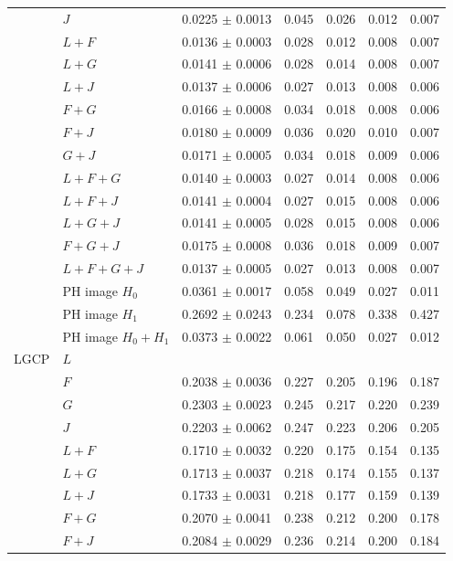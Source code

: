 \begin{longtable}{@{}ll c cccc@{}}
 & $J$ & 0.0225 $\pm$ 0.0013 & 0.045 & 0.026 & 0.012 & 0.007\\
 & $L{+}F$ & 0.0136 $\pm$ 0.0003 & 0.028 & 0.012 & 0.008 & 0.007\\
 & $L{+}G$ & 0.0141 $\pm$ 0.0006 & 0.028 & 0.014 & 0.008 & 0.007\\
 & $L{+}J$ & 0.0137 $\pm$ 0.0006 & 0.027 & 0.013 & 0.008 & 0.006\\
 & $F{+}G$ & 0.0166 $\pm$ 0.0008 & 0.034 & 0.018 & 0.008 & 0.006\\
 & $F{+}J$ & 0.0180 $\pm$ 0.0009 & 0.036 & 0.020 & 0.010 & 0.007\\
 & $G{+}J$ & 0.0171 $\pm$ 0.0005 & 0.034 & 0.018 & 0.009 & 0.006\\
 & $L{+}F{+}G$ & 0.0140 $\pm$ 0.0003 & 0.027 & 0.014 & 0.008 & 0.006\\
 & $L{+}F{+}J$ & 0.0141 $\pm$ 0.0004 & 0.027 & 0.015 & 0.008 & 0.006\\
 & $L{+}G{+}J$ & 0.0141 $\pm$ 0.0005 & 0.028 & 0.015 & 0.008 & 0.006\\
 & $F{+}G{+}J$ & 0.0175 $\pm$ 0.0008 & 0.036 & 0.018 & 0.009 & 0.007\\
 & $L{+}F{+}G{+}J$ & 0.0137 $\pm$ 0.0005 & 0.027 & 0.013 & 0.008 & 0.007\\
 & PH image $H_0$ & 0.0361 $\pm$ 0.0017 & 0.058 & 0.049 & 0.027 & 0.011\\
 & PH image $H_1$ & 0.2692 $\pm$ 0.0243 & 0.234 & 0.078 & 0.338 & 0.427\\
 & PH image $H_0{+}H_1$ & 0.0373 $\pm$ 0.0022 & 0.061 & 0.050 & 0.027 & 0.012\\
\midrule
LGCP & $L$ & \B{0.1706 $\pm$ 0.0037} & \B{0.217} & \B{0.174} & \B{0.156} & \B{0.135}\\
 & $F$ & 0.2038 $\pm$ 0.0036 & 0.227 & 0.205 & 0.196 & 0.187\\
 & $G$ & 0.2303 $\pm$ 0.0023 & 0.245 & 0.217 & 0.220 & 0.239\\
 & $J$ & 0.2203 $\pm$ 0.0062 & 0.247 & 0.223 & 0.206 & 0.205\\
 & $L{+}F$ & 0.1710 $\pm$ 0.0032 & 0.220 & 0.175 & 0.154 & 0.135\\
 & $L{+}G$ & 0.1713 $\pm$ 0.0037 & 0.218 & 0.174 & 0.155 & 0.137\\
 & $L{+}J$ & 0.1733 $\pm$ 0.0031 & 0.218 & 0.177 & 0.159 & 0.139\\
 & $F{+}G$ & 0.2070 $\pm$ 0.0041 & 0.238 & 0.212 & 0.200 & 0.178\\
 & $F{+}J$ & 0.2084 $\pm$ 0.0029 & 0.236 & 0.214 & 0.200 & 0.184\\

\end{longtable}

